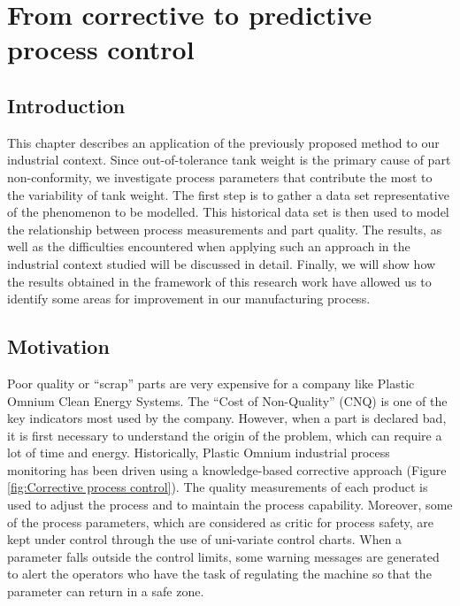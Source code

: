 \chapter{From corrective to predictive process control} \label{From Corrective to Predictive Process Control}
\minitoc

\section{Introduction}

This chapter describes an application of the previously proposed method to our industrial context. Since out-of-tolerance tank weight is the primary cause of part non-conformity, we investigate process parameters that contribute the most to the variability of tank weight. The first step is to gather a data set representative of the phenomenon to be modelled.  This historical data set is then used to model the relationship between process measurements and part quality. The results, as well as the difficulties encountered when applying such an approach in the industrial context studied will be discussed in detail. Finally, we will show how the results obtained in the framework of this research work have allowed us to identify some areas for improvement in our manufacturing process. 


\section{Motivation}

Poor quality or ``scrap'' parts are very expensive for a company like Plastic Omnium Clean Energy Systems. The “Cost of Non-Quality” (CNQ) is one of the key indicators most used by the company. However, when a part is declared bad, it is first necessary to understand the origin of the problem, which can require a lot of time and energy. Historically, Plastic Omnium industrial process monitoring has been driven using a knowledge-based corrective approach (Figure \ref{fig:Corrective process control}). The quality measurements of each product is used to adjust the process and to maintain the process capability. Moreover, some of the process parameters, which are considered as critic for process safety, are kept under control through the use of uni-variate control charts.  When a parameter falls outside the control limits, some warning messages are generated to alert the operators who have the task of regulating the machine so that the parameter can return in a safe zone. 

